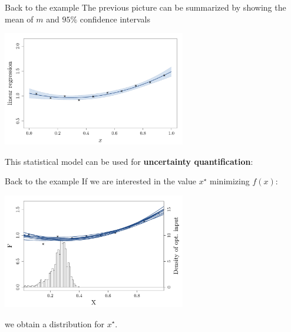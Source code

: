 \documentclass{beamer}
\begin{document}
\begin{frame}{}
\begin{exampleblock}{Back to the example}
The previous picture can be summarized by showing the mean of $m$ and $95\%$ confidence intervals
\begin{center}
  \includegraphics[height=5cm]{figures/R/linreg_5}
\end{center}
\end{exampleblock}
\end{frame}

\begin{frame}{}
    This statistical model can be used for \textbf{uncertainty quantification}:
\begin{exampleblock}{Back to the example}
If we are interested in the value $x^\star$ minimizing $f(x)$:
\begin{center}
  \includegraphics[height=5cm]{figures/R/linreg_6}
\end{center}
\end{exampleblock}
\alert{we obtain a distribution for $x^\star$.}
\end{frame}
\end{document}
